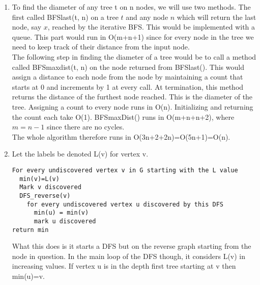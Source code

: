 \begin{enumerate}[1.]
\item

To find the diameter of any tree t on n nodes, we will use two methods. The first called BFSlast(t, n) on a tree $t$ and any node $n$ which will return the last node, say $x$, reached by the iterative BFS. This would be implemented with a queue. This part would run in O(m+n+1) since for every node in the tree we need to keep track of their distance from the input node.\\
The following step in finding the diameter of a tree would be to call a method called BFSmaxdist(t, n) on the node returned from BFSlast(). This would assign a distance to each node from the node by maintaining a count that starts at 0 and increments by 1 at every call. At termination, this method returns the distance of the furthest node reached. This is the diameter of the tree. Assigning a count to every node runs in O(n). Initializing and returning the count each take O(1). BFSmaxDist() runs in O(m+n+n+2), where $m=n-1$ since there are no cycles.\\
The whole algorithm therefore runs in O(3n+2+2n)=O(5n+1)=O(n).

\item Let the labels be denoted L(v) for vertex v.\\
\begin{verbatim}
For every undiscovered vertex v in G starting with the L value
  min(v)=L(v)
  Mark v discovered
  DFS_reverse(v)
    for every undiscovered vertex u discovered by this DFS
      min(u) = min(v)
      mark u discovered
return min
\end{verbatim}
What this does is it starts a DFS but on the reverse graph starting from the node in question. In the main loop of the DFS though, it considers L(v) in increasing values. If vertex u is in the depth first tree starting at v then min(u)=v. 

\end{enumerate}

